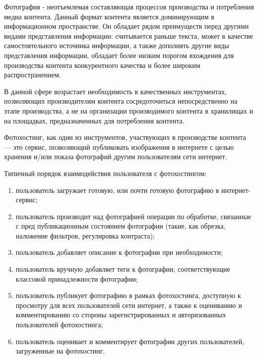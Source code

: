 
Фотография - неотъемлемая составляющая процессов производства и потребления медиа контента.
Данный формат контента является доминирующим в информационном пространстве. Он обладает рядом преимуществ перед другими видами представления информации: считывается раньше текста, может в качестве самостоятельного источника информации, а также дополнять другие виды представления информации, обладает более низким порогом вхождения для производства контента конкурентного качества и более широким распространением.

В данной сфере возрастает необходимость в качественных инструментах, позволяющих производителям контента сосредоточиться непосредственно на этапе производства, а не на организации производимого контента в хранилищах и на площадках, предназначенных для потребления контента.

Фотохостинг, как один из инструментов, участвующих в производстве контента — это сервис, позволяющий публиковать изображения в интернете с целью хранения и/или показа фотографий другим пользователям сети интернет.

Типичный порядок взаимодействия пользователя с фотохостингом:
\begin{enumerate}
    \item пользователь загружает готовую, или почти готовую фотографию в интернет-сервис;
    \item пользователь производит над фотографией операции по обработке, связанные с пред публикационным состоянием фотографии (такие, как обрезка, наложение фильтров, регулировка контраста);
    \item пользователь добавляет описание к фотографии при необходимости;
    \item пользователь вручную добавляет теги к фотографии, соответствующие классовой принадлежности фотографии;
    \item пользователь публикует фотографию в рамках фотохостинга, доступную к просмотру для всех пользователей сети интернет, а также к оцениванию и комментированию со стороны зарегистрированных и авторизованных пользователей фотохостинга;
    \item пользователь оценивает и комментирует фотографии других пользователей, загруженные на фотохостинг.
\end{enumerate}

